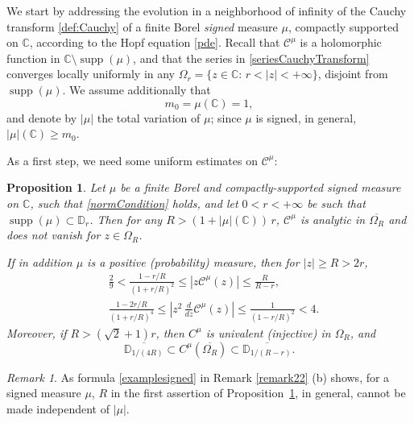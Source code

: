 \documentclass[reqno,11pt]{amsart}
\theoremstyle{plain}
\newtheorem{prop}[thm]{Proposition}
\theoremstyle{definition}
\theoremstyle{remark}
\newtheorem{remark}[thm]{Remark}
\numberwithin{equation}{section}
\numberwithin{equation}{section}
\DeclareMathOperator{\supp}{supp}
\newcommand{\C}{\mathbb{C}}
\newcommand{\D}{\mathbb{D}}
\begin{document}
We start by addressing the evolution in a neighborhood of infinity of the Cauchy transform \eqref{def:Cauchy} of a finite Borel \textit{signed} measure $\mu$, compactly supported on $\C$, according to the Hopf equation \eqref{pde}. 
Recall that $\mathcal C^\mu$ is a holomorphic function in $\C \setminus \supp(\mu)$, and that the series in \eqref{seriesCauchyTransform} converges locally uniformly in any $\Omega_r=\{z\in \C:\, r<|z|<+\infty\}$, disjoint from $\supp(\mu)$. We assume additionally that 
\begin{equation}
    \label{normCondition}
m_0=\mu(\C)=1,
\end{equation}
and denote by $|\mu|$ the total variation of $\mu$; since $\mu$ is signed, in general, $|\mu| (\C)\geq m_0$.

As a first step, we need some uniform estimates on $\mathcal C^\mu$:
\begin{prop}
    \label{prob:boundsCauchy}
    Let $\mu$ be a finite Borel and compactly-supported signed measure on $\C$, such that \eqref{normCondition} holds, and let  $0<r<+\infty$ be such that $\supp (\mu) \subset\D_r$. Then for any $R>  (1+|\mu|(\C))\, r$,  $\mathcal C^\mu$ is analytic in $\overline{\Omega_R}$ and does not vanish for $z\in \Omega_R$.

If in addition $\mu$ is a positive (probability) measure, then for $|z|\ge R>2r$,
    \begin{align}
        \label{boundsCauchy1}
    & \frac{2}{9}< \frac{1-r/R}{(1+r/R)^2} \le \left|  z\mathcal C^\mu(z)\right| \le \frac{R}{R-r} ,
    \\  
    & \frac{1-2r/R}{(1+r/R)^4} \le \left| z^2\, \frac{d}{dz}\mathcal C^\mu(z)\right| \le \frac{1}{(1-r/R)^2}<4.
\label{boundsCauchy2}
    \end{align}
Moreover, if $R>(\sqrt{2}+1)r$, then $C^\mu$ is univalent (injective) in  $\Omega_R$, and 
\begin{equation} \label{image}
\overline{\D_{1/(4R)}}\subset C^\mu\left( \overline{\Omega_R} \right)\subset \overline{\D_{1/(R-r)}}.
\end{equation}
\end{prop}
\begin{remark}
    As formula \eqref{examplesigned} in Remark \ref{remark22} (b) shows, for a signed measure $\mu$, $R$ in the first assertion of Proposition~\ref{prob:boundsCauchy}, in general, cannot be made independent of $|\mu|$.
\end{remark}
\end{document}

